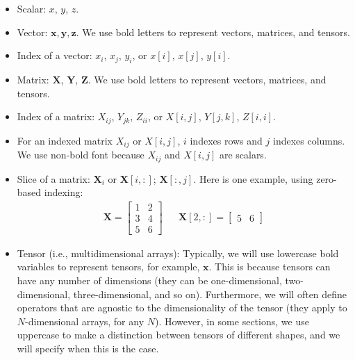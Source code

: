 \begin{itemize}
\item Scalar: $x$, $y$, $z$.
\item Vector: $\mathbf{x}, \mathbf{y}, \mathbf{z}$. We use bold letters to represent vectors, matrices, and tensors.
\item Index of a vector: $x_i$, $x_j$, $y_i$, or $x[i]$, $x[j]$, $y[i]$.
\item Matrix: $\mathbf{X}$, $\mathbf{Y}$, $\mathbf{Z}$. We use bold letters to represent vectors, matrices, and tensors.
\item Index of a matrix: $X_{ij}$, $Y_{jk}$, $Z_{ii}$, or $X[i,j]$, $Y[j,k]$, $Z[i,i]$.
\item For an indexed matrix $X_{ij}$ or $X[i,j]$, $i$ indexes rows and $j$ indexes columns. We use non-bold font because $X_{ij}$ and $X[i,j]$ are scalars.
\item Slice of a matrix: $\mathbf{X}_i$ or $\mathbf{X}[i,:]$; $\mathbf{X}[:,j]$. Here is one example, using zero-based indexing:
\begin{align*}
\mathbf{X} = 
\begin{bmatrix}
    1 & 2 \\
    3 & 4 \\
    5 & 6
\end{bmatrix}
&&
\mathbf{X}[2,:] = 
\begin{bmatrix}
    5 & 6
\end{bmatrix}
\end{align*}
\item Tensor (i.e., multidimensional arrays): Typically, we will use lowercase bold variables to represent tensors, for example, $\mathbf{x}$. This is because tensors can have any number of dimensions (they can be one-dimensional, two-dimensional, three-dimensional, and so on). Furthermore, we will often define operators that are agnostic to the dimensionality of the tensor (they apply to $N$-dimensional arrays, for any $N$). However, in some sections, we use uppercase to make a distinction between tensors of different shapes, and we will specify when this is the case. 
\end{itemize}
